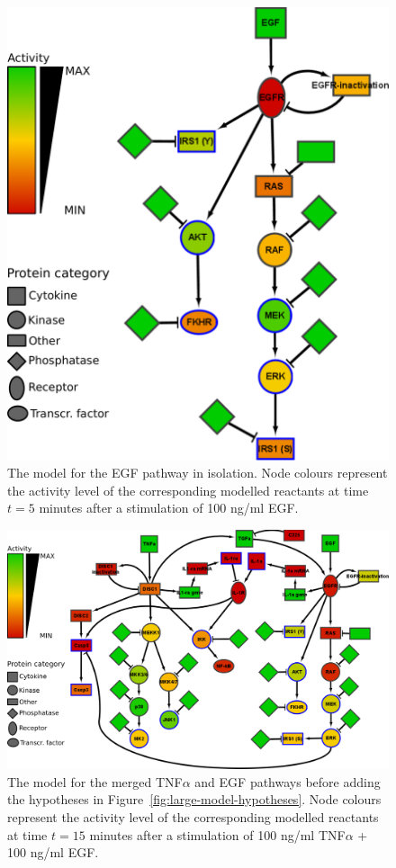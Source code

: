 \begin{figure}[!tpb]
\begin{minipage}{\textwidth}
\centering
  \includegraphics[width=.7\textwidth]{images/large_network_egf3}
\caption{The model for the EGF pathway in isolation. Node colours represent the
activity level of the corresponding modelled reactants at time $t = 5$ minutes after
a stimulation of 100 ng/ml EGF.}\label{fig:large-model-egf}
\end{minipage}
\end{figure}


\begin{figure}[!tpb]
\begin{minipage}{\textwidth}
\centering
  \includegraphics[width=\textwidth]{images/large_network_tnf_egf_merged_no_hyp_bis2}
\caption{The model for the merged TNF$\alpha$ and EGF pathways before
adding the hypotheses in Figure~\ref{fig:large-model-hypotheses}. Node colours represent the
activity level of the corresponding modelled reactants at time $t = 15$ minutes after
a stimulation of 100 ng/ml TNF$\alpha$ + 100 ng/ml EGF.}\label{fig:large-model-tnf-egf-merged}
\end{minipage}
\end{figure}


